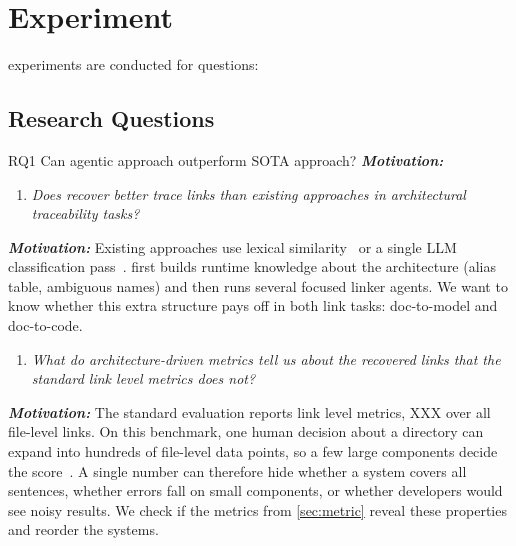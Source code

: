 \section{Experiment}

experiments are conducted for questions:
\subsection{Research Questions}

RQ1 Can agentic approach outperform SOTA approach?
\emph{\textbf{Motivation:}}

\begin{enumerate}[leftmargin=*, labelindent=0em, label=\textbf{RQ\arabic*}:,
ref=RQ\arabic*, series=researchQuestions] \item \label{RQ1 SOTA comparison}
\emph{Does \approach recover better trace links than existing approaches in architectural traceability tasks?} 
\end{enumerate}
\emph{\textbf{Motivation:}}
Existing approaches use lexical similarity~\cite{swattr} or a single \ac{LLM}
classification pass~\cite{lissa}. \approach first builds runtime knowledge about
the architecture (alias table, ambiguous names) and then runs several focused
linker agents. We want to know whether this extra structure pays off in both
link tasks: doc-to-model and doc-to-code.

\begin{enumerate}[leftmargin=*, labelindent=0em, label=\textbf{RQ\arabic*}:, ref=RQ\arabic*, series=researchQuestions, resume]
    \item \label{RQ2 metrics} \emph{What do architecture-driven metrics tell us about the recovered links that the standard link level metrics does not?}
\end{enumerate}
\emph{\textbf{Motivation:}}
The standard evaluation reports link level metrics, XXX over all file-level links.
On this benchmark, one human decision about a directory can expand into hundreds of file-level data points, 
so a few large components decide the score~\cite{replication}.
A single number can therefore hide whether a system covers all sentences, 
whether errors fall on small components, or whether developers would see noisy results.
We check if the metrics from \autoref{sec:metric} reveal these properties and reorder the systems.


